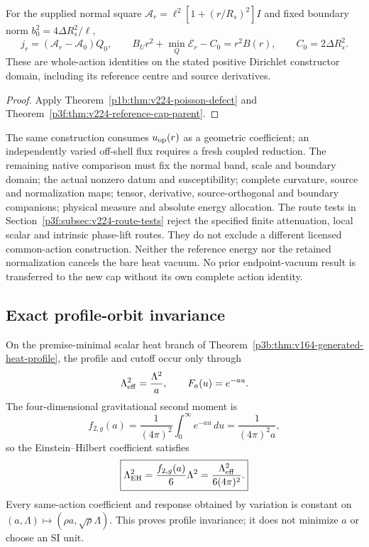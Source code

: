 \documentclass[12pt,a4paper]{article}
\begin{document}
\begin{corollary}
\label{p3e:cor:v224-reference-source-status}
For the supplied normal square $\mathcal A_r=\ell^2[1+(r/R_s)^2]I$
and fixed boundary norm $b_0^2=4\Delta R_s^2/\ell$,
\[
 j_r=(\mathcal A_r-\mathcal A_0)Q_0,\qquad
 B_Ur^2+\min_Q\mathscr E_r-C_0=r^2B(r),\qquad
 C_0=2\Delta R_s^2.
\]
These are whole-action identities on the stated positive Dirichlet
constructor domain, including its reference centre and source derivatives.
\end{corollary}
\begin{proof}
Apply Theorem~\ref{p1b:thm:v224-poisson-defect} and
Theorem~\ref{p3f:thm:v224-reference-cap-parent}.
\end{proof}
The same construction consumes $u_{\rm op}(r)$ as a geometric coefficient;
an independently varied off-shell flux requires a fresh coupled reduction.
The remaining native comparison must fix the normal band, scale and
boundary domain; the actual nonzero datum and susceptibility; complete
curvature, source and normalization maps; tensor, derivative, source-orthogonal
and boundary companions; physical measure and absolute energy allocation.
The route tests in Section~\ref{p3f:subsec:v224-route-tests} reject the
specified finite attenuation, local scalar and intrinsic phase-lift routes.
They do not exclude a different licensed common-action construction.
Neither the reference energy nor the retained normalization cancels the
bare heat vacuum. No prior endpoint-vacuum result is transferred to the
new cap without its own complete action identity.


\subsection{Exact profile-orbit invariance}
\label{p3e:sec:v164-profile-orbit}

\begin{theorem}
\label{p3e:thm:v164-generated-gravitational-heat-orbit}
On the premise-minimal scalar heat branch of
Theorem~\ref{p3b:thm:v164-generated-heat-profile}, the profile and cutoff
occur only through
\[
 \Lambda_{\rm eff}^2=\frac{\Lambda^2}{a},
 \qquad F_a(u)=e^{-au}.
\]
The four-dimensional gravitational second moment is
\[
 f_{2,g}(a)=\frac1{(4\pi)^2}\int_0^\infty e^{-au}\,du
 =\frac1{(4\pi)^2a},
\]
so the Einstein--Hilbert coefficient satisfies
\[
 \boxed{
 \Lambda_{\rm EH}^2
 =\frac{f_{2,g}(a)}6\Lambda^2
 =\frac{\Lambda_{\rm eff}^2}{6(4\pi)^2}.}
\]
Every same-action coefficient and response obtained by variation is constant
on \((a,\Lambda)\mapsto(\rho a,\sqrt\rho\Lambda)\).  This proves profile
invariance; it does not minimize \(a\) or choose an SI unit.
\end{theorem}
\end{document}

